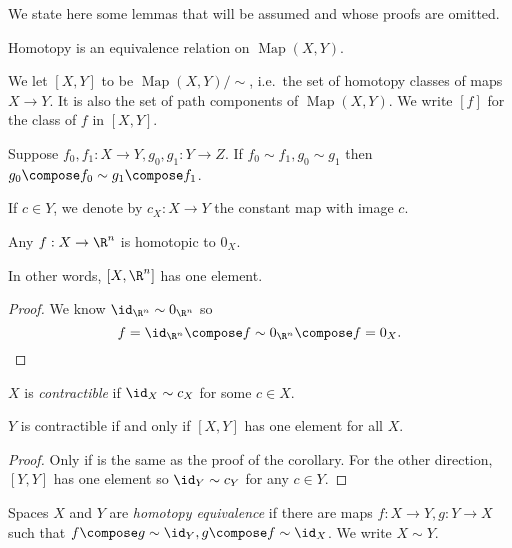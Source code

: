 \documentclass[a4paper]{article}
\DeclareMathOperator{\Map}{Map} %
\begin{document}
We state here some lemmas that will be assumed and whose proofs are omitted.

\begin{lemma}
  Homotopy is an equivalence relation on \(\Map(X, Y)\).
\end{lemma}

\begin{definition}
  We let \([X, Y]\) to be \(\Map(X, Y)/\sim\), i.e.\ the set of homotopy classes of maps \(X \to Y\). It is also the set of path components of \(\Map(X, Y)\). We write \([f]\) for the class of \(f\) in \([X, Y]\).
\end{definition}

\begin{lemma}
  Suppose \(f_0, f_1: X \to Y, g_0, g_1 : Y \to Z\). If \(f_0 \sim f_1, g_0 \sim g_1\) then \(g_0 \compose f_0 \sim g_1 \compose f_1\).
\end{lemma}

\begin{notation}
  If \(c \in Y\), we denote by \(c_X: X \to Y\) the constant map with image \(c\).
\end{notation}

\begin{corollary}
  Any \(f: X \to \R^n\) is homotopic to \(0_X\).
\end{corollary}

In other words, \([X, \R^n]\) has one element.

\begin{proof}
  We know \(\id_{\R^n} \sim 0_{\R^n}\) so
  \[
    f = \id_{\R^n} \compose f \sim 0_{\R^n} \compose f = 0_X.
  \]
\end{proof}

\begin{definition}[contractible]
  \(X\) is \emph{contractible} if \(\id_X \sim c_X\) for some \(c \in X\).
\end{definition}

\begin{proposition}
  \(Y\) is contractible if and only if \([X, Y]\) has one element for all \(X\).
\end{proposition}

\begin{proof}
  Only if is the same as the proof of the corollary. For the other direction, \([Y, Y]\) has one element so \(\id_Y \sim c_Y\) for any \(c \in Y\).
\end{proof}

\begin{definition}
  Spaces \(X\) and \(Y\) are \emph{homotopy equivalence} if there are maps \(f: X \to Y, g: Y \to X\) such that \(f \compose g \sim \id_Y, g \compose f \sim \id_X\). We write \(X \sim Y\).
\end{definition}
\end{document}
